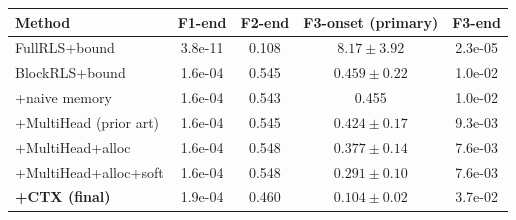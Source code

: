 \begin{tabular}{lcccc}
\toprule
Method & F1-end & F2-end & F3-onset (primary) & F3-end \\
\midrule
FullRLS+bound & 3.8e-11 & 0.108 & $8.17\pm3.92$ & 2.3e-05 \\
BlockRLS+bound & 1.6e-04 & 0.545 & $0.459\pm0.22$ & 1.0e-02 \\
+naive memory & 1.6e-04 & 0.543 & 0.455 & 1.0e-02 \\
+MultiHead (prior art) & 1.6e-04 & 0.545 & $0.424\pm0.17$ & 9.3e-03 \\
+MultiHead+alloc & 1.6e-04 & 0.548 & $0.377\pm0.14$ & 7.6e-03 \\
+MultiHead+alloc+soft & 1.6e-04 & 0.548 & $0.291\pm0.10$ & 7.6e-03 \\
\textbf{+CTX (final)} & 1.9e-04 & 0.460 & $\mathbf{0.104\pm0.02}$ & 3.7e-02 \\
\bottomrule
\end{tabular}